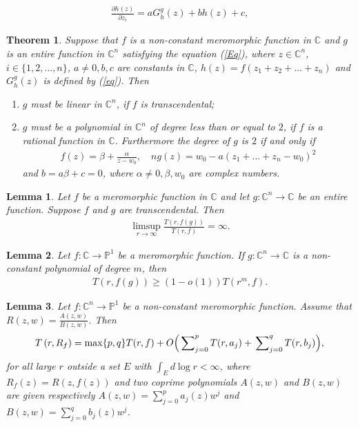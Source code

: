\documentclass[10pt,a4paper]{amsart}
\newtheorem{theo}{Theorem}
\newtheorem{lem}{Lemma}
\begin{document}
\begin{align}\label{Eq}
\frac{\partial h(z)}{\partial z_i}=a G^g_{h}(z)+bh(z)+c,
\end{align}

\begin{theo}\label{t1.1} Suppose that $f$ is a non-constant meromorphic function in $\mathbb{C}$ and $g$ is an entire function in $\mathbb{C}^n$ satisfying the equation (\ref{Eq}),
where $z\in\mathbb{C}^n$, $i\in\{1,2,\ldots,n\}$, $a\neq 0, b,c$ are constants in $\mathbb{C}$, $h(z)=f(z_1+z_2+\ldots+z_n)$ and $G^g_h(z)$ is defined by (\ref{eq}). Then 
\begin{enumerate}
\item[(i)] $g$ must be linear in $\mathbb{C}^n$, if $f$ is transcendental;
\item[(ii)] $g$ must be a polynomial in $\mathbb{C}^n$ of degree less than or equal to $2$, if $f$ is a rational function in $\mathbb{C}$. Furthermore the degree of $g$ is $2$ if and only if 
\begin{align*}
f(z)=\beta+\frac{\alpha}{z-w_0},\quad ng(z)=w_0-a\left(z_1+\ldots+z_n-w_0\right)^2
\end{align*}
and $b=a\beta+c=0$, where $\alpha\neq 0, \beta, w_0$ are complex numbers.
\end{enumerate}
\end{theo}

\begin{lem}\label{Lm2} Let $f$ be a meromorphic function in $\mathbb{C}$ and let $g:\mathbb{C}^n\to \mathbb{C}$ be an entire function. Suppose $f$ and $g$ are transcendental. Then 
\begin{align*}
\limsup\limits_{r\to\infty}\frac{T(r,f(g))}{T(r,f)}=\infty.
\end{align*}
\end{lem}

\begin{lem}\label{L1.1} Let $f:\mathbb{C}\to \mathbb{P}^1$ be a meromorphic function. If $g:\mathbb{C}^n\to \mathbb{C}$ is a non-constant polynomial of degree $m$, then 
	\begin{align*}
		T(r,f(g))\geq (1-o(1))T(r^m,f).
	\end{align*}
	\end{lem}

\begin{lem}\label{L3} \cite[Theorem 1.26]{Hu-Li-Yang-2003} Let $f:\mathbb{C}^n\to\mathbb{P}^1$ be a non-constant meromorphic function. Assume that 
$R(z, w)=\frac{A(z, w)}{B(z, w)}$. Then
\begin{align*}
 T\left(r, R_f\right)=\max \{p, q\} T(r, f)+O\Big(\sideset{}{_{j=0}^{p}}{\sum}T(r, a_j)+\sideset{}{_{j=0}^{q}}{\sum}T(r, b_j)\Big),
 \end{align*}
for all large $r$ outside a set $E$ with $\int_E d\log r<\infty$, where $R_f(z)=R(z, f(z))$ and two coprime polynomials $A(z, w)$ and $B(z,w)$ are given
respectively $A(z,w)=\sum_{j=0}^p a_j(z)w^j$ and $B(z,w)=\sum_{j=0}^q b_j(z)w^j$.
\end{lem}
\end{document}

